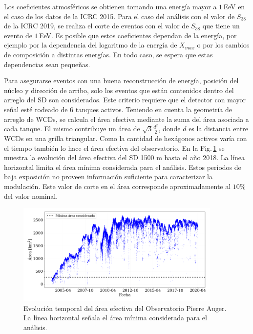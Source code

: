 Los coeficientes atmosféricos se obtienen tomando una energía mayor a $1\,$EeV en el caso de los datos de la ICRC 2015. Para el caso del análisis con el valor de $S_{38}$ de la ICRC 2019, se realiza el corte de eventos con el valor de $S_{38}$  que tiene un evento de $1\,$EeV. Es posible que estos coeficientes dependan de la energía, por ejemplo por la dependencia del logaritmo de la energía de $X_{max}$ o por los cambios de composición a distintas energías. En todo caso, se espera que estas dependencias sean pequeñas.%


Para asegurarse eventos con una buena reconstrucción de  energía, posición del núcleo y dirección de arribo, solo los eventos que están contenidos dentro del arreglo del SD son considerados. Este criterio requiere que el detector con mayor señal esté rodeado de 6 tanques activos. Teniendo en cuenta la geometría de arreglo de WCDs, se calcula el área efectiva mediante la suma del área asociada a cada tanque. El mismo contribuye un área de $\sqrt{3} \frac{d^2}{2}$, donde $d$ es la distancia entre WCDs en una grilla triangular. Como la cantidad de hexágonos activos varía con el tiempo también lo hace  el área efectiva del observatorio. En la Fig.\,\ref{fig:area} se muestra la evolución del área efectiva del SD 1500 m hasta el año 2018. La línea horizontal  limita el área mínima considerada para el análisis. Estos periodos de baja exposición no proveen información suficiente para caracterizar la modulación.
Este valor de corte en el área corresponde aproximadamente al $10\%$ del valor nominal.
\begin{figure}[H]
    \centering
    \includegraphics[width=0.9\textwidth]{Graphs/clima/area_v2.png}
    \caption{Evolución temporal del área efectiva del Observatorio Pierre Auger. La línea horizontal señala el área mínima considerada para el análisis.}
    \label{fig:area}
\end{figure}

